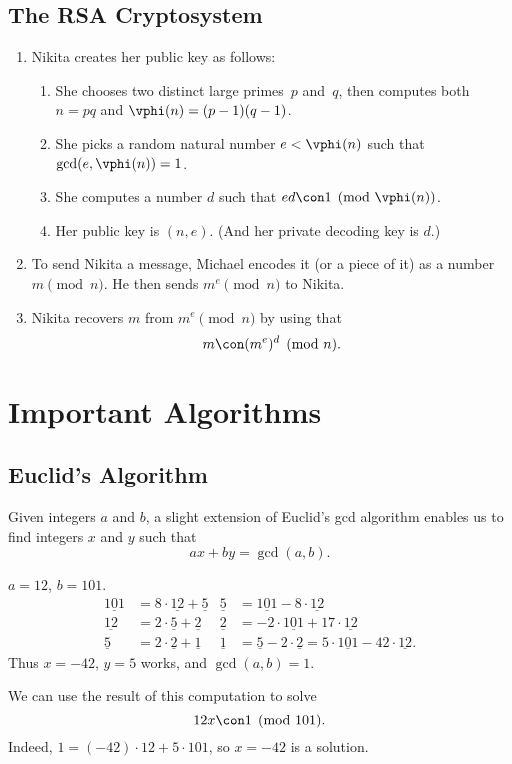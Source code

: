 \documentclass[11pt]{report}
\newcommand{\ul}[1]{\underline{#1}}
\begin{document}
\subsection{The RSA Cryptosystem}
\begin{enumerate}
  \item Nikita creates her public key as follows:
        \begin{enumerate}
          \item She chooses two distinct large primes~$p$ and~$q$, then
                computes both $n=pq$ and $\vphi(n) = (p-1)(q-1)$.
          \item She picks a random natural number $e<\vphi(n)$ such
                that $\gcd(e,\vphi(n))=1$.
          \item She computes a number $d$ such that $ed\con 1\pmod{\vphi(n)}$.
          \item Her public key is $(n,e)$.   (And her private decoding key is $d$.)
        \end{enumerate}
  \item To send Nikita a message, Michael encodes it (or a piece of it)
        as a number $m\pmod{n}$.  He then sends $m^e\pmod{n}$ to Nikita.
  \item Nikita recovers $m$ from $m^e\pmod{n}$ by using that
        $$m \con (m^e)^d\pmod{n}.$$
\end{enumerate}

\section{Important Algorithms}
\subsection{Euclid's Algorithm}
Given integers $a$ and $b$, a slight extension of Euclid's gcd
algorithm enables us to find integers $x$ and $y$ such that
$$
  ax + by = \gcd(a,b).
$$
\begin{example}
  $a=12$, $b=101$.
  \begin{align*}
    \ul{101} & =8\cdot \ul{12} + \ul{5} & \ul{5} & =\ul{101}-8\cdot \ul{12}                                      \\
    \ul{12}  & =2\cdot\ul{5} + \ul{2}   & \ul{2} & = -2\cdot \ul{101} + 17\cdot \ul{12}                          \\
    \ul{5}   & =2\cdot \ul{2}+ \ul{1}   & \ul{1} & = \ul{5} - 2\cdot \ul{2} = 5\cdot \ul{101} - 42\cdot \ul{12}.
  \end{align*}
  Thus $x=-42$, $y=5$ works, and $\gcd(a,b)=1$.

  We can use the result of this computation to solve
  $$12x\con 1\pmod{101}.$$
  Indeed, $1=(-42)\cdot 12 + 5\cdot 101$, so
  $x=-42$ is a solution.
\end{example}
\end{document}
